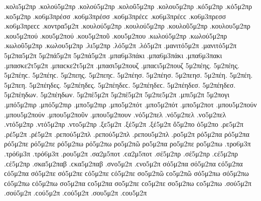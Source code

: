 {.κολι5μ2πρ   %
.κολού5μ2πρ .κολού5μ2πρ   %
.κολοῦ5μ2πρ 
.κολου5μ2πρ 
.κό5μ2πρ .κό5μ2πρ   %
.κο5μ2πρ 
.κο6μ3πρέσσ .κο6μ3πρέσσ .κο6μ3πρέϲϲ .κο6μ3πρέϲϲ   %
.κο6μ3πρεσσ .κο6μ3πρεϲϲ 
.κοντρα5μ2π   %
.κουλού5μ2πρ .κουλού5μ2πρ   %
.κουλοῦ5μ2πρ 
.κουλου5μ2πρ 
.κου5μ2πού .κου5μ2πού   %
.κου5μ2ποῦ 
.κου5μ2που 
.κωλού5μ2πρ .κωλού5μ2πρ   %
.κωλοῦ5μ2πρ 
.κωλου5μ2πρ 
.λι5μ2πρ   %
.λό5μ2π .λό5μ2π   %
.μανιτό5μ2π .μανιτό5μ2π   %
5μ2πα5μ2π   %
5μ2πά5μ2π 5μ2πά5μ2π   %
.μπα6μ3πάκι .μπα6μ3πάκι   %
.μπα6μ3πακι 
.μπασκε2τ5μ2π .μπαϲκε2τ5μ2π   %
.μπασι5μ2πουζ .μπαϲι5μ2πουζ   %
5μ2πέης. 5μ2πέης. 5μ2πέηϲ. 5μ2πέηϲ.   %
5μ2πεης. 5μ2πεηϲ. 
5μ2πέησ. 5μ2πέησ. 
5μ2πεησ. 
5μ2πέη. 5μ2πέη. 
5μ2πεη. 
5μ2πέηδες. 5μ2πέηδες. 5μ2πέηδεϲ. 5μ2πέηδεϲ. 
5μ2πέηδεσ. 5μ2πέηδεσ. 
5μ2πέηδων. 5μ2πέηδων. 
5μ2πέ5μ2π 5μ2πέ5μ2π   %
5μ2πε5μ2π 
.μπι5μ2π   %
5μ2πογι   %
.μπό5μ2πιρ .μπό5μ2πιρ   %
.μπο5μ2πιρ   %
.μπο5μ2πότ .μπο5μ2πότ   %
.μπο5μ2ποτ 
.μπου5μ2πούν .μπου5μ2πούν   %
.μπου5μ2ποῦν 
.μπου5μ2πουν 
.νό5μ2πελ .νό5μ2πελ   %
.νο5μ2πελ 
.ντό5μ2πρ .ντό5μ2πρ   %
.ντο5μ2πρ 
.ξε5μ2π   %
.ξέ5μ2π .ξέ5μ2π 
ὄ5μ2πο   %
ὀ5μ2πο 
.ρε5μ2π   %
.ρέ5μ2π .ρέ5μ2π   %
.ρεπού5μ2πλ .ρεπού5μ2πλ   %
.ρεπου5μ2πλ   %
.ρο5μ2π   %
ρό5μ2πα ρό5μ2πα   %
ρό5μ2πε ρό5μ2πε 
ρό5μ2πω ρό5μ2πω 
ρο5μ2πῶ 
ρο5μ2πα 
ρο5μ2πε 
ρο5μ2πω 
.τρο6μ3π   %
.τρό6μ3π .τρό6μ3π   %
.ρου5μ2π   %
.σα2μ5ποτ .ϲα2μ5ποτ   %
.σέ5μ2πρ .σέ5μ2πρ .ϲέ5μ2πρ .ϲέ5μ2πρ   %
.σκα5μ2παβ .ϲκα5μ2παβ   %
.σνο5μ2π .ϲνο5μ2π   %
σό5μ2πα σό5μ2πα ϲό5μ2πα ϲό5μ2πα   %
σό5μ2πε σό5μ2πε ϲό5μ2πε ϲό5μ2πε 
σο5μ2πῶ ϲο5μ2πῶ 
σό5μ2πω σό5μ2πω ϲό5μ2πω ϲό5μ2πω 
σο5μ2πα ϲο5μ2πα 
σο5μ2πε ϲο5μ2πε 
σο5μ2πω ϲο5μ2πω 
.σού5μ2π .σού5μ2π .ϲού5μ2π .ϲού5μ2π   %
.σου5μ2π .ϲου5μ2π 
}
